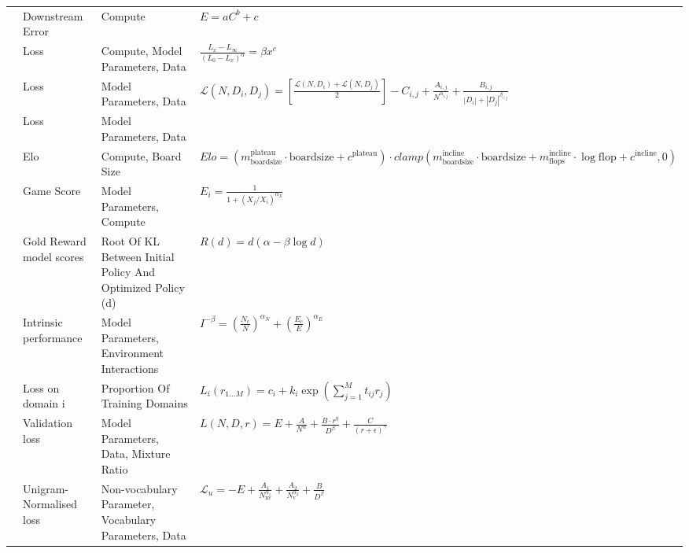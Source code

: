 \begin{table*}[htbp]
{\begin{tabular}{p{35mm} p{35mm} p{45mm} p{125mm}}
    \citet{zhai_scaling_2022} & Downstream Error & Compute & \(E = aC^b +c\) \\
    \citet{alabdulmohsin_revisiting_2022} & Loss & Compute, Model Parameters, Data & \(\frac{L_x - L_\infty}{(L_0 - L_x)^\alpha} = \beta x^c\) \\
    \citet{aghajanyan_scaling_2023} & Loss & Model Parameters, Data & \(\mathcal{L}(N, D_i, D_j) = \left[\frac{\mathcal{L}(N, D_i) + \mathcal{L}(N, D_j)}{2}\right] - C_{i,j} + \frac{A_{i,j}}{N^{\alpha_{i,j}}} + \frac{B_{i,j}}{|D_i| + |D_j|^{\beta_{i,j}}}\) \\
    \citet{li_are_2024} & Loss & Model Parameters, Data &  \\
    \citet{jones_scaling_2021} & Elo & Compute, Board Size & \(Elo = \left( m_{\text{boardsize}}^{\text{plateau}} \cdot \text{boardsize} + c^{\text{plateau}}\right) \cdot clamp( m_{\text{boardsize}}^{\text{incline}} \cdot \text{boardsize} + m_{\text{flops}}^{\text{incline}} \cdot \log \text{flop} + c^{\text{incline}}, 0)\) \\
    \citet{neumann_scaling_2023} & Game Score  & Model Parameters, Compute & \(E_i = \frac{1}{1 + (X_j/X_i)^{\alpha_X}}\) \\
    \citet{gao_scaling_2022} & Gold Reward model scores & Root Of KL Between Initial Policy And Optimized Policy (d) & \(R(d) = d(\alpha - \beta\log d)\) \\
    \citet{hilton_scaling_2023} & Intrinsic performance 
    & Model Parameters, Environment Interactions 
    & \(I^{-\beta} = \left(\frac{N_c}{N}\right)^{\alpha_N} + \left(\frac{E_c}{E}\right)^{\alpha_E}\) \\
    \citet{ye_data_2024} & Loss on domain i & Proportion Of Training Domains & \(L_i(r_{1...M}) = c_i + k_i \exp\left(\sum_{j=1}^M t_{ij}r_j\right)\) \\
    \citet{que_d-cpt_2024} & Validation loss & Model Parameters, Data, Mixture Ratio & \(L(N, D, r) = E + \frac{A}{N^\alpha} + \frac{B \cdot r^\eta}{D^\beta} + \frac{C}{(r + \epsilon)^\gamma}\) \\
    \citet{tao_scaling_2024} & Unigram-Normalised loss & Non-vocabulary Parameter, Vocabulary Parameters, Data & \(\mathcal{L}_u = -E + \frac{A_1}{N_{\text{nv}}^{\alpha_1}} + \frac{A_2}{N_{\text{v}}^{\alpha_2}} + \frac{B}{D^\beta}\) \\

\end{tabular}}
\end{table*}
